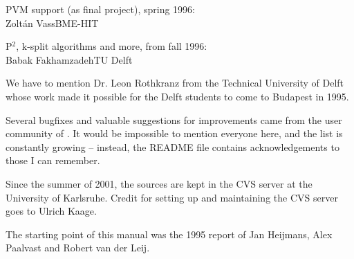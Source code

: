 PVM support (as final project), spring 1996:\\
\tab Zolt\'{a}n Vass\tab \tab BME-HIT

P$^{2}$, k-split algorithms and more, from fall 1996:\\
\tab Babak Fakhamzadeh\tab TU Delft


We have to mention Dr. Leon Rothkranz from the Technical University
of Delft whose work made it possible for the Delft students to
come to Budapest in 1995.

Several bugfixes and valuable suggestions for improvements came
from the user community of {\opp}. It would be impossible to
mention everyone here, and the list is constantly growing --
instead, the README file contains acknowledgements to those I
can remember.

Since the summer of 2001, the {\opp} sources are kept in the
CVS server at the University of Karlsruhe. Credit for setting
up and maintaining the CVS server goes to Ulrich Kaage.

The starting point of this manual was the 1995 report of Jan
Heijmans, Alex Paalvast and Robert van der Leij.

